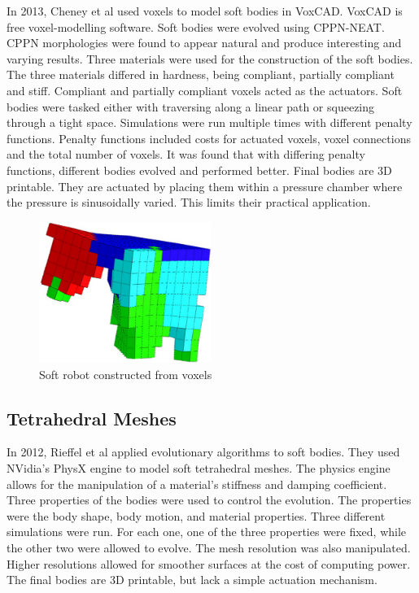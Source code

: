 In 2013, Cheney et al used voxels to model soft bodies in VoxCAD. VoxCAD is free voxel-modelling software. Soft bodies were evolved using CPPN-NEAT. CPPN morphologies were found to appear natural and produce interesting and varying results. Three materials were used for the construction of the soft bodies. The three materials differed in hardness, being compliant, partially compliant and stiff. Compliant and partially compliant voxels acted as the actuators. Soft bodies were tasked either with traversing along a linear path or squeezing through a tight space. Simulations were run multiple times with different penalty functions. Penalty functions included costs for actuated voxels, voxel connections and the total number of voxels. It was found that with differing penalty functions, different bodies evolved and performed better. Final bodies are 3D printable. They are actuated by placing them within a pressure chamber where the pressure is sinusoidally varied. This limits their practical application. \cite{Cheney2013,Cheney2015}

\begin{figure}[H]
	\centering
	\includegraphics[width=0.5\textwidth]{Voxel.png}
	\caption{Soft robot constructed from voxels \cite{Cheney2013}}
	\label{fig:vox}
\end{figure}

\subsection{Tetrahedral Meshes}

In 2012, Rieffel et al applied evolutionary algorithms to soft bodies. They used NVidia's PhysX engine to model soft tetrahedral meshes. The physics engine allows for the manipulation of a material's stiffness and damping coefficient. Three properties of the bodies were used to control the evolution. The properties were the body shape, body motion, and material properties. Three different simulations were run. For each one, one of the three properties were fixed, while the other two were allowed to evolve. The mesh resolution was also manipulated. Higher resolutions allowed for smoother surfaces at the cost of computing power. The final bodies are 3D printable, but lack a simple actuation mechanism. \cite{Rieffel2013}

